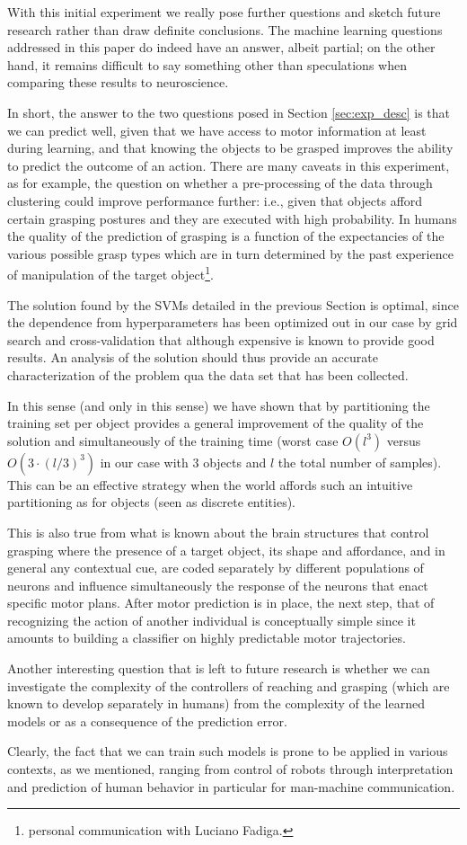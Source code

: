 With this initial experiment we really pose further questions and
sketch future research rather than draw definite conclusions. The
machine learning questions addressed in this paper do indeed have an
answer, albeit partial; on the other hand, it remains difficult to say
something other than speculations when comparing these results to
neuroscience.

In short, the answer to the two questions posed in Section
\ref{sec:exp_desc} is that we can predict well, given that we have
access to motor information at least during learning, and that knowing
the objects to be grasped improves the ability to predict the outcome
of an action. There are many caveats in this experiment, as for
example, the question on whether a pre-processing of the data through
clustering could improve performance further: i.e., given that objects
afford certain grasping postures and they are executed with high
probability. In humans the quality of the prediction of grasping is a
function of the expectancies of the various possible grasp types which
are in turn determined by the past experience of manipulation of the
target object\footnote{personal communication with Luciano Fadiga.}.

The solution found by the SVMs detailed in the previous Section is
optimal, since the dependence from hyperparameters has been optimized
out in our case by grid search and cross-validation that although
expensive is known to provide good results. An analysis of the
solution should thus provide an accurate characterization of the
problem qua the data set that has been collected.

In this sense (and only in this sense) we have shown that by
partitioning the training set per object provides a general
improvement of the quality of the solution and simultaneously of the
training time (worst case $O(l^3)$ versus $O(3 \cdot (l/3)^3)$ in our
case with $3$ objects and $l$ the total number of samples). This can
be an effective strategy when the world affords such an intuitive
partitioning as for objects (seen as discrete entities).

This is also true from what is known about the brain structures that
control grasping where the presence of a target object, its shape and
affordance, and in general any contextual cue, are coded separately by
different populations of neurons and influence simultaneously the
response of the neurons that enact specific motor plans. After motor
prediction is in place, the next step, that of recognizing the action
of another individual is conceptually simple since it amounts to
building a classifier on highly predictable motor trajectories.

Another interesting question that is left to future research is
whether we can investigate the complexity of the controllers of
reaching and grasping (which are known to develop separately in
humans) from the complexity of the learned models or as a
consequence of the prediction error.

Clearly, the fact that we can train such models is prone to
be applied in various contexts, as we mentioned, ranging from control
of robots through interpretation and prediction of human behavior in
particular for man-machine communication.

